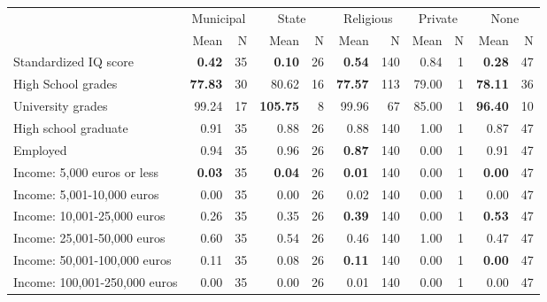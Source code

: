 \begin{tabular}{l r r r r r r r r r r}
\toprule
& \multicolumn{2}{c}{Municipal} & \multicolumn{2}{c}{State} & \multicolumn{2}{c}{Religious} & \multicolumn{2}{c}{Private} & \multicolumn{2}{c}{None} \\
& \scriptsize Mean & \scriptsize N & \scriptsize Mean & \scriptsize N & \scriptsize Mean & \scriptsize N & \scriptsize Mean & \scriptsize N & \scriptsize Mean & \scriptsize N \\
\midrule
Standardized IQ score & \textbf{     0.42} &        35 & \textbf{     0.10} &        26 & \textbf{     0.54} &       140 &      0.84 &         1 & \textbf{     0.28} &        47 \\
High School grades & \textbf{    77.83} &        30 &     80.62 &        16 & \textbf{    77.57} &       113 &     79.00 &         1 & \textbf{    78.11} &        36 \\
University grades &     99.24 &        17 & \textbf{   105.75} &         8 &     99.96 &        67 &     85.00 &         1 & \textbf{    96.40} &        10 \\
High school graduate &      0.91 &        35 &      0.88 &        26 &      0.88 &       140 &      1.00 &         1 &      0.87 &        47 \\
Employed &      0.94 &        35 &      0.96 &        26 & \textbf{     0.87} &       140 &      0.00 &         1 &      0.91 &        47 \\
Income: 5,000 euros or less & \textbf{     0.03} &        35 & \textbf{     0.04} &        26 & \textbf{     0.01} &       140 &      0.00 &         1 & \textbf{     0.00} &        47 \\
Income: 5,001-10,000 euros &      0.00 &        35 &      0.00 &        26 &      0.02 &       140 &      0.00 &         1 &      0.00 &        47 \\
Income: 10,001-25,000 euros &      0.26 &        35 &      0.35 &        26 & \textbf{     0.39} &       140 &      0.00 &         1 & \textbf{     0.53} &        47 \\
Income: 25,001-50,000 euros &      0.60 &        35 &      0.54 &        26 &      0.46 &       140 &      1.00 &         1 &      0.47 &        47 \\
Income: 50,001-100,000 euros &      0.11 &        35 &      0.08 &        26 & \textbf{     0.11} &       140 &      0.00 &         1 & \textbf{     0.00} &        47 \\
Income: 100,001-250,000 euros &      0.00 &        35 &      0.00 &        26 &      0.01 &       140 &      0.00 &         1 &      0.00 &        47 \\

\end{tabular}
